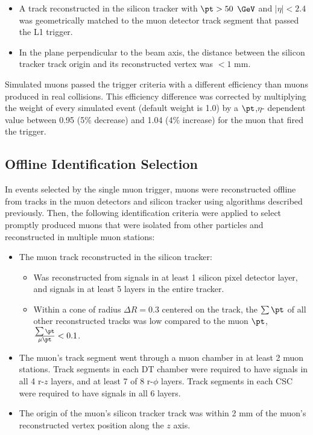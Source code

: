 \begin{itemize}
	\item A track reconstructed in the silicon tracker with $\pt > 50$ $\GeV$ and $|\eta| < 2.4$ was geometrically matched to 
		the muon detector track segment that passed the L1 trigger.
	\item In the plane perpendicular to the beam axis, the distance between the silicon tracker track origin and its 
		reconstructed vertex was $< 1$ mm.
\end{itemize}

Simulated muons passed the trigger criteria with a different efficiency than muons produced in real collisions.  This 
efficiency difference was corrected by multiplying the weight of every simulated event (default weight is 1.0) by a $\pt$,$\eta$-
dependent value between 0.95 (5\% decrease) and 1.04 (4\% increase) for the muon that fired the trigger.

\subsection{Offline Identification Selection}
In events selected by the single muon trigger, muons were reconstructed offline from tracks in the muon detectors and silicon tracker using 
algorithms described previously.  Then, the following identification criteria were applied to select promptly produced muons 
that were isolated from other particles and reconstructed in multiple muon stations:

\begin{itemize}
	\item The muon track reconstructed in the silicon tracker:
	\begin{itemize}
		\item Was reconstructed from signals in at least 1 silicon pixel detector layer, and signals in at least 
			5 layers in the entire tracker.
		\item Within a cone of radius $\Delta R = 0.3$ centered on the track, the $\sum \pt$ of all other 
			reconstructed tracks was low compared to the muon $\pt$, $\frac{\sum \pt}{\mu \pt} < 0.1$.
	\end{itemize}
	\item The muon's track segment went through a muon chamber in at least 2 muon stations.  Track segments in each DT 
		chamber were required to have signals in all 4 r-$z$ layers, and at least 7 of 8 r-$\phi$ layers.  Track segments 
		in each CSC were required to have signals in all 6 layers.
	\item The origin of the muon's silicon tracker track was within 2 mm of the muon's reconstructed vertex 
		position along the $z$ axis.
\end{itemize}

